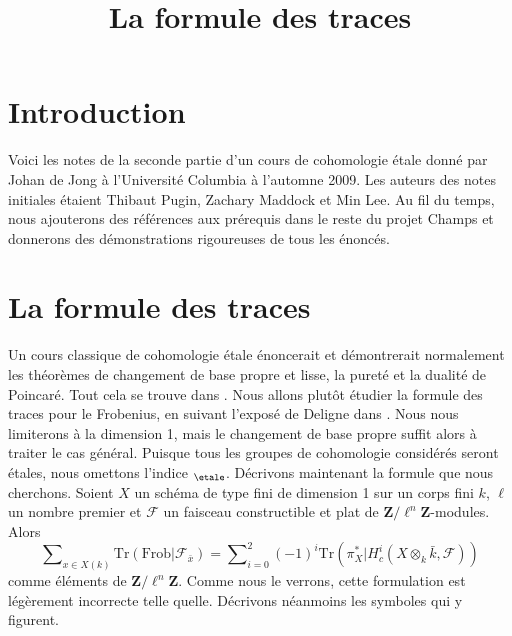 

%


\title{La formule des traces}


\maketitle

\label{section-phantom}

\tableofcontents


\section{Introduction}
\label{section-introduction}

\noindent
Voici les notes de la seconde partie d'un cours de cohomologie \'etale
donné par Johan de Jong à l'Université Columbia à l'automne 2009. Les
auteurs des notes initiales étaient Thibaut Pugin, Zachary Maddock et Min Lee.
Au fil du temps, nous ajouterons des références aux prérequis dans le reste du
projet Champs et donnerons des démonstrations rigoureuses de tous les énoncés.









\section{La formule des traces}
\label{section-trace-formula}

\noindent
Un cours classique de cohomologie \'etale énoncerait et démontrerait normalement
les théorèmes de changement de base propre et lisse, la pureté et la dualité de
Poincar\'e. Tout cela se trouve dans \cite[Arcata]{SGA4.5}. Nous allons plutôt
étudier la formule des traces pour le Frobenius, en suivant l'exposé de Deligne
dans \cite[Rapport]{SGA4.5}. Nous nous limiterons à la dimension 1, mais le
changement de base propre suffit alors à traiter le cas général. Puisque tous
les groupes de cohomologie considérés seront \'etales, nous omettons l'indice
$_\etale$. Décrivons maintenant
la formule que nous cherchons. Soient $X$ un schéma de type fini de dimension 1
sur un corps fini $k$, $\ell$ un nombre premier et $\mathcal{F}$ un faisceau
constructible et plat de $\mathbf{Z}/\ell^n\mathbf{Z}$-modules. Alors
\begin{equation}
\label{equation-trace-formula-initial}
\sum\nolimits_{x \in X(k)}
\text{Tr}(\text{Frob} | \mathcal{F}_{\bar x}) =
\sum\nolimits_{i = 0}^2
(-1)^i \text{Tr}(\pi_X^* | H^i_c(X \otimes_k \bar k, \mathcal{F}))
\end{equation}
comme éléments de $\mathbf{Z}/\ell^n\mathbf{Z}$. Comme nous le verrons, cette
formulation est légèrement incorrecte telle quelle. Décrivons néanmoins les
symboles qui y figurent.




